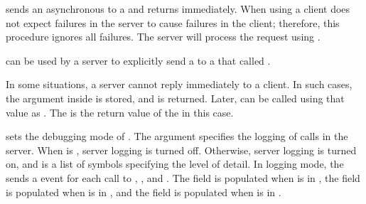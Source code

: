 \begin{argtbl}
\end{argtbl}

 sends an asynchronous  to a
 and returns  immediately. When using
 a client does not expect failures in the
server to cause failures in the client; therefore, this procedure
ignores all failures. The server will process the request using
.

\begin{procedure}
\end{procedure}
\returns{}

\begin{argtbl}
\end{argtbl}

 can be used by a server to explicitly send a
 to a  that called .

In some situations, a server cannot reply immediately to a client. In
such cases, the  argument inside  is
stored, and  is returned.  Later,
 can be called using that  value as
. The  is the return value of the
 in this case.

\begin{procedure}
\end{procedure}
\returns{} 

\begin{argtbl}
\end{argtbl}

 sets the debugging mode of .
The  argument specifies the logging of calls in
the server. When  is , server logging
is turned off. Otherwise, server logging is turned on, and
 is a list of symbols specifying the level of
detail.  In logging mode, the  sends a
 event for each call to
, , and
. The  field is populated when
 is in , the  field is
populated when  is in , and the
 field is populated when  is in
.

